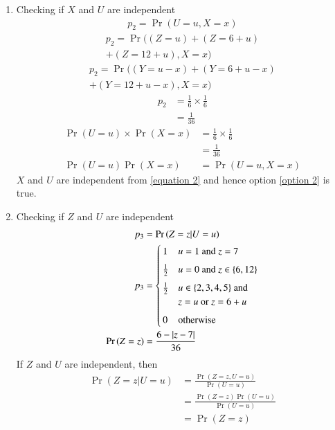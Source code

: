 \documentclass[journal,12pt,twocolumn]{IEEEtran}
\begin{document}
\begin{enumerate}
\item Checking if $X$ and $U$ are independent
\begin{align}
    p_2 = \Pr{(U=u, X=x)}
\end{align}
\begin{multline}
    p_2 = \Pr{((Z=u) + (Z=6+u)}
    \\+ (Z=12+u), X=x)
\end{multline}
\begin{multline}
    p_2 = \Pr{((Y=u-x) + (Y=6+u-x)}
    \\+ (Y=12+u-x), X=x)
\end{multline}
\begin{align}
    p_2 &= \frac{1}{6} \times \frac{1}{6}
    \\&= \frac{1}{36}
\end{align}
\begin{align}
    \Pr{(U=u)}\times \Pr{(X=x)} &= \frac{1}{6} \times \frac{1}{6}
    \\&= \frac{1}{36}
    \\\Pr{(U=u)}\Pr{(X=x)} &= \Pr{(U=u, X=x)}  \label{equation 2}
\end{align}
$X$ and $U$ are independent from \eqref{equation 2} and hence option \eqref{option 2} is true.
\item Checking if $Z$ and $U$ are independent
\begin{align}
    p_3 &= \Pr{(Z=z| U=u)}
    \\p_3 &= 
    \begin{cases}
        1 & u=1 \text{ and } z=7\\ ~\\[-1em]
        \frac{1}{2} & u=0 \text{ and } z\in\{6,12\}\\ ~\\[-1em]
        \frac{1}{2} & u\in\{2,3,4,5\}  \text{ and } \\&z=u \text{ or } z=6+u\\ ~\\[-1em]
        0 & \text{otherwise}
    \end{cases}
    \\\Pr{(Z=z)} &= \frac{6 - \vert z-7\vert}{36}
\end{align}
If $Z$ and $U$ are independent, then
\begin{align}
    \Pr{(Z=z| U=u)} &= \frac{\Pr{(Z=z, U=u)}}{\Pr{(U=u)}}
    \\&= \frac{\Pr{(Z=z)}\Pr{(U=u)}}{\Pr{(U=u)}}
    \\&= \Pr{(Z=z)}
\end{align}

\end{enumerate}
\end{document}
